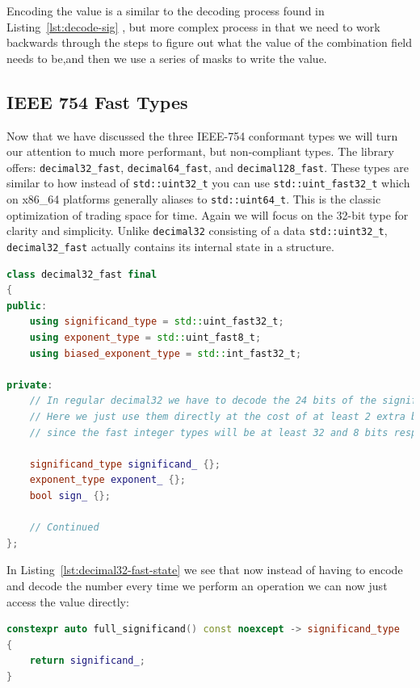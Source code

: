 \documentclass[acmsmall]{acmart}
\newcommand{\code}[1]{\texttt{#1}}
\begin{document}
Encoding the value is a similar to the decoding process found in Listing~\ref{lst:decode-sig} , but more complex process in that we need to work backwards through the steps to figure out what the value of the combination field needs to be,and then we use a series of masks to write the value.

\subsection{IEEE 754 Fast Types}

Now that we have discussed the three IEEE-754 conformant types we will turn our attention to much more performant, but non-compliant types.
The library offers: \code{decimal32\_fast}, \code{decimal64\_fast}, and \code{decimal128\_fast}.
These types are similar to how instead of \code{std::uint32\_t} you can use \code{std::uint\_fast32\_t} which on x86\_64 platforms generally aliases to \code{std::uint64\_t}.
This is the classic optimization of trading space for time.
Again we will focus on the 32-bit type for clarity and simplicity.
Unlike \code{decimal32} consisting of a data \code{std::uint32\_t}, \code{decimal32\_fast} actually contains its internal state in a structure.

\begin{lstlisting}[language=C++, caption={Internal state of \code{decimal32\_fast}}, label={lst:decimal32-fast-state}]
class decimal32_fast final
{
public:
    using significand_type = std::uint_fast32_t;
    using exponent_type = std::uint_fast8_t;
    using biased_exponent_type = std::int_fast32_t;

private:
    // In regular decimal32 we have to decode the 24 bits of the significand and the 8 bits of the exp
    // Here we just use them directly at the cost of at least 2 extra bytes of internal state
    // since the fast integer types will be at least 32 and 8 bits respectively

    significand_type significand_ {};
    exponent_type exponent_ {};
    bool sign_ {};
    
    // Continued
};
\end{lstlisting}

In Listing~\ref{lst:decimal32-fast-state} we see that now instead of having to encode and decode the number every time we perform an operation we can now just access the value directly:

\begin{lstlisting}[language=C++, caption={Decoding \code{decimal32\_fast} significand}, label={lst:decimal32-fast-sig}]
constexpr auto full_significand() const noexcept -> significand_type
{
    return significand_;
}
\end{lstlisting} 
    
\end{document}
